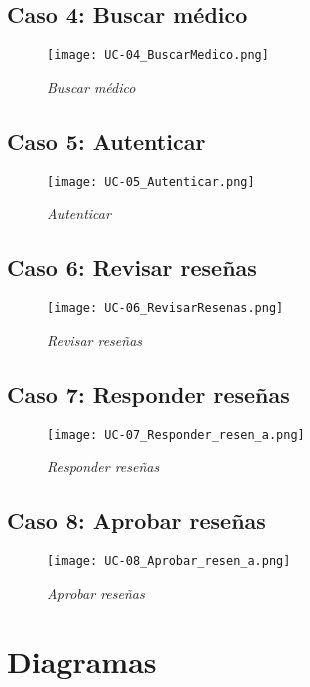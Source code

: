 \subsection{Caso 4: Buscar médico}

\begin{figure}[H]
\centering
\texttt{[image: UC-04\_BuscarMedico.png]}
\caption{\textit{Buscar médico}}
\end{figure}

\subsection{Caso 5: Autenticar}

\begin{figure}[H]
\centering
\texttt{[image: UC-05\_Autenticar.png]}
\caption{\textit{Autenticar}}
\end{figure}

\subsection{Caso 6: Revisar reseñas}

\begin{figure}[H]
\centering
\texttt{[image: UC-06\_RevisarResenas.png]}
\caption{\textit{Revisar reseñas}}
\end{figure}

\subsection{Caso 7: Responder reseñas}

\begin{figure}[H]
\centering
\texttt{[image: UC-07\_Responder\_resen\_a.png]}
\caption{\textit{Responder reseñas}}
\end{figure}

\subsection{Caso 8: Aprobar reseñas}

\begin{figure}[H]
\centering
\texttt{[image: UC-08\_Aprobar\_resen\_a.png]}
\caption{\textit{Aprobar reseñas}}
\end{figure}

\section{Diagramas}

